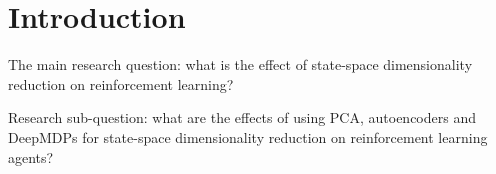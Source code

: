 \chapter{Introduction}\label{introduction}

The main research question: what is the effect of state-space dimensionality reduction on reinforcement learning? %

Research sub-question: what are the effects of using PCA, autoencoders and DeepMDPs for state-space dimensionality reduction on reinforcement learning agents? 

%
